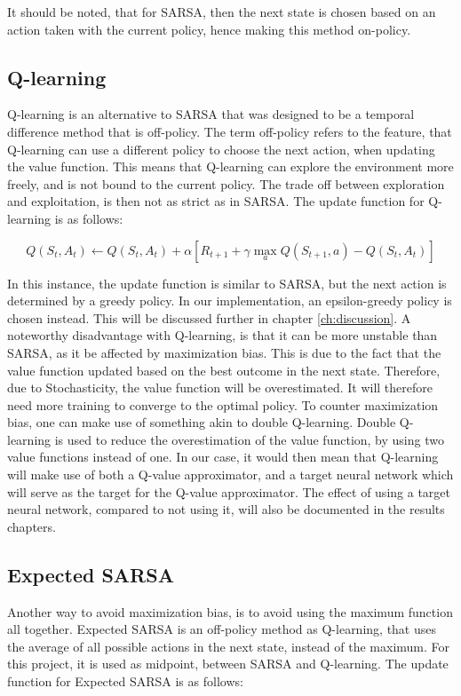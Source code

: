 It should be noted, that for SARSA, then the next state is chosen based on an action taken with the current policy, hence making this method on-policy.


\subsection{Q-learning} \label{sec:Q-learning}
Q-learning is an alternative to SARSA that was designed to be a temporal difference method that is off-policy. The term off-policy refers to the feature, that Q-learning can use a different policy to choose the next action, when updating the value function. This means that Q-learning can explore the environment more freely, and is not bound to the current policy. The trade off between exploration and exploitation, is then not as strict as in SARSA. The update function for Q-learning is as follows:

\begin{equation}
    Q(S_t, A_t) \leftarrow Q(S_t, A_t) + \alpha \left[ R_{t+1} + \gamma \max_a Q(S_{t+1}, a) - Q(S_t, A_t) \right]
\end{equation}

In this instance, the update function is similar to SARSA, but the next action is determined by a greedy policy. In our implementation, an epsilon-greedy policy is chosen instead. This will be discussed further in chapter \ref{ch:discussion}. A noteworthy disadvantage with Q-learning, is that it can be more unstable than SARSA, as it be affected by maximization bias. This is due to the fact that the value function updated based on the best outcome in the next state. Therefore, due to Stochasticity, the value function will be overestimated. It will therefore need more training to converge to the optimal policy. To counter maximization bias, one can make use of something akin to double Q-learning. Double Q-learning is used to reduce the overestimation of the value function, by using two value functions instead of one. In our case, it would then mean that Q-learning will make use of both a Q-value approximator, and a target neural network which will serve as the target for the Q-value approximator. The effect of using a target neural network, compared to not using it, will also be documented in the results chapters.



\subsection{Expected SARSA} \label{sec:expected_sarsa}
Another way to avoid maximization bias, is to avoid using the maximum function all together. Expected SARSA is an off-policy method as Q-learning, that uses the average of all possible actions in the next state, instead of the maximum. For this project, it is used as midpoint, between SARSA and Q-learning. The update function for Expected SARSA is as follows:

